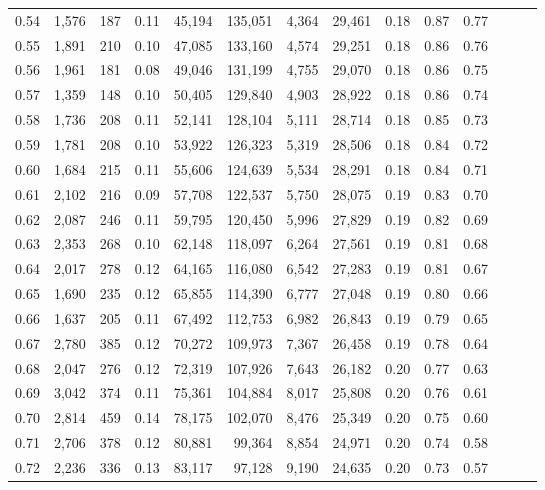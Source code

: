 \begin{tabular}{rrrrrrrrrrrrrr}
0.54 &  1,576 &    187 &  0.11 &   45,194 &  135,051 &   4,364 &  29,461 &  0.18 &  0.87 &      0.77 \\
0.55 &  1,891 &    210 &  0.10 &   47,085 &  133,160 &   4,574 &  29,251 &  0.18 &  0.86 &      0.76 \\
0.56 &  1,961 &    181 &  0.08 &   49,046 &  131,199 &   4,755 &  29,070 &  0.18 &  0.86 &      0.75 \\
0.57 &  1,359 &    148 &  0.10 &   50,405 &  129,840 &   4,903 &  28,922 &  0.18 &  0.86 &      0.74 \\
0.58 &  1,736 &    208 &  0.11 &   52,141 &  128,104 &   5,111 &  28,714 &  0.18 &  0.85 &      0.73 \\
0.59 &  1,781 &    208 &  0.10 &   53,922 &  126,323 &   5,319 &  28,506 &  0.18 &  0.84 &      0.72 \\
0.60 &  1,684 &    215 &  0.11 &   55,606 &  124,639 &   5,534 &  28,291 &  0.18 &  0.84 &      0.71 \\
0.61 &  2,102 &    216 &  0.09 &   57,708 &  122,537 &   5,750 &  28,075 &  0.19 &  0.83 &      0.70 \\
0.62 &  2,087 &    246 &  0.11 &   59,795 &  120,450 &   5,996 &  27,829 &  0.19 &  0.82 &      0.69 \\
0.63 &  2,353 &    268 &  0.10 &   62,148 &  118,097 &   6,264 &  27,561 &  0.19 &  0.81 &      0.68 \\
0.64 &  2,017 &    278 &  0.12 &   64,165 &  116,080 &   6,542 &  27,283 &  0.19 &  0.81 &      0.67 \\
0.65 &  1,690 &    235 &  0.12 &   65,855 &  114,390 &   6,777 &  27,048 &  0.19 &  0.80 &      0.66 \\
0.66 &  1,637 &    205 &  0.11 &   67,492 &  112,753 &   6,982 &  26,843 &  0.19 &  0.79 &      0.65 \\
0.67 &  2,780 &    385 &  0.12 &   70,272 &  109,973 &   7,367 &  26,458 &  0.19 &  0.78 &      0.64 \\
0.68 &  2,047 &    276 &  0.12 &   72,319 &  107,926 &   7,643 &  26,182 &  0.20 &  0.77 &      0.63 \\
0.69 &  3,042 &    374 &  0.11 &   75,361 &  104,884 &   8,017 &  25,808 &  0.20 &  0.76 &      0.61 \\
0.70 &  2,814 &    459 &  0.14 &   78,175 &  102,070 &   8,476 &  25,349 &  0.20 &  0.75 &      0.60 \\
0.71 &  2,706 &    378 &  0.12 &   80,881 &   99,364 &   8,854 &  24,971 &  0.20 &  0.74 &      0.58 \\
0.72 &  2,236 &    336 &  0.13 &   83,117 &   97,128 &   9,190 &  24,635 &  0.20 &  0.73 &      0.57 \\

\end{tabular}

